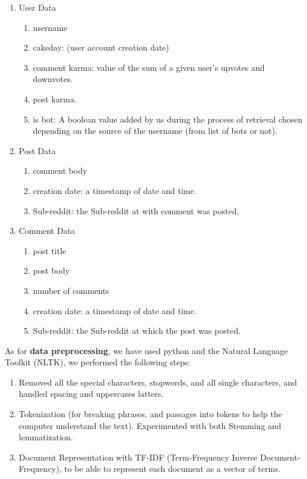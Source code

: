 \documentclass{article}
\begin{document}
    \begin{enumerate}
        \item User Data
            \begin{enumerate}
                \item username
                \item cakeday: (user account creation date)
                \item comment karma: value of the sum of a given user's upvotes and downvotes.
                \item post karma.
                \item is bot: A boolean value added by us during the process of retrieval chosen depending on the source of the username (from list of bots or not).
            \end{enumerate}
        \item Post Data
            \begin{enumerate}
                \item comment body
                \item creation date: a timestamp of date and time.
                \item Sub-reddit: the Sub-reddit at with comment was posted.
            \end{enumerate}
        \item Comment Data
            \begin{enumerate}
                \item post title
                \item post body
                \item number of comments
                \item creation date: a timestamp of date and time.
                \item Sub-reddit: the Sub-reddit at which the post was posted.
            \end{enumerate}
    \end{enumerate}
As for \textbf{data preprocessing}, we have used  python and the Natural Language Toolkit (NLTK), we performed the following steps:\\

\begin{enumerate}
    \item Removed all the special characters, stopwords, and all single characters,  and handled spacing and uppercases latters.
    \item Tokenization (for breaking phrases, and passages into tokens to help the computer understand the text). Experimented with both Stemming and lemmatization.
    \item Document Representation with TF-IDF (Term-Frequency Inverse Document-Frequency), to be able to represent each document as a vector of terms.
\end{enumerate}
\end{document}
